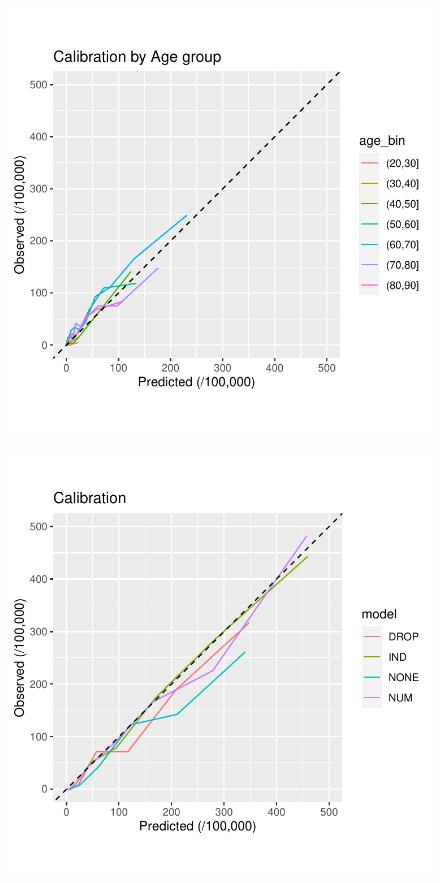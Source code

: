 \documentclass[12pt]{article}
\begin{document}
\begin{figure}[h]
\centering
\includegraphics[width=1.0\textwidth]{figures/birthyear/calibration_age_zoom.pdf}
\end{figure}

\begin{figure}[h]
\centering
\includegraphics[width=1.0\textwidth]{figures/birthyear/calibration10_birthcohort_zoom.pdf}
\end{figure}
\end{document}
